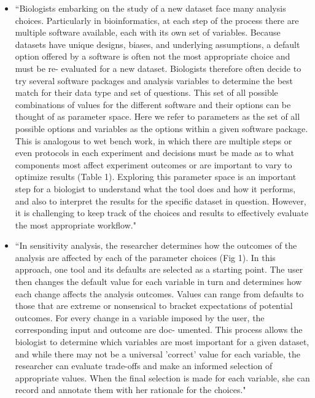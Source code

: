 \documentclass[pdftex,english,11pt,parskip=half]{scrartcl}
\begin{document}
\begin{itemize}
\item ``Biologists embarking on the study of a new dataset face many analysis choices. Particularly in bioinformatics, at each step of the process there are multiple software available, each with its own set of variables. Because datasets have unique designs, biases, and underlying assumptions, a default option offered by a software is often not the most appropriate choice and must be re- evaluated for a new dataset. Biologists therefore often decide to try several software packages and analysis variables to determine the best match for their data type and set of questions. This set of all possible combinations of values for the different software and their options can be thought of as parameter space. Here we refer to parameters as the set of all possible options and variables as the options within a given software package. This is analogous to wet bench work, in which there are multiple steps or even protocols in each experiment and decisions must be made as to what components most affect experiment outcomes or are important to vary to optimize results (Table 1). Exploring this parameter space is an important step for a biologist to understand what the tool does and how it performs, and also to interpret the results for the specific dataset in question. However, it is challenging to keep track of the choices and results to effectively evaluate the most appropriate workflow." \cite{shade2015computing}
\item ``In sensitivity analysis, the researcher determines how the outcomes of the analysis are affected by each of the parameter choices (Fig 1). In this approach, one tool and its defaults are selected as a starting point. The user then changes the default value for each variable in turn and determines how each change affects the analysis outcomes. Values can range from defaults to those that are extreme or nonsensical to bracket expectations of potential outcomes. For every change in a variable imposed by the user, the corresponding input and outcome are doc- umented. This process allows the biologist to determine which variables are most important for a given dataset, and while there may not be a universal 'correct' value for each variable, the researcher can evaluate trade-offs and make an informed selection of appropriate values. When the final selection is made for each variable, she can record and annotate them with her rationale for the choices." \cite{shade2015computing}

\end{itemize}
\end{document}
